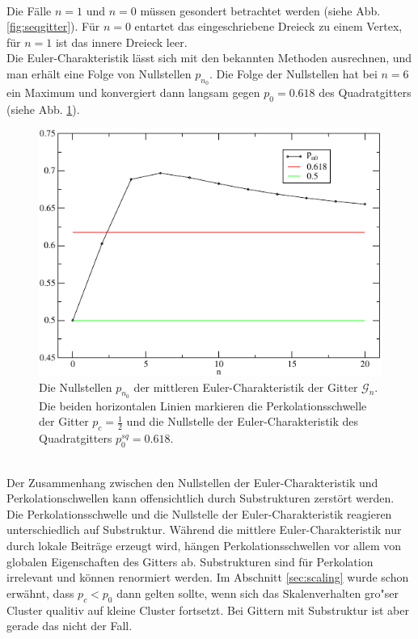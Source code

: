 \\Die F\"alle $n=1$ und $n=0$ m\"ussen gesondert betrachtet werden (siehe Abb. \ref{fig:seqgitter}). F\"ur $n=0$ entartet das eingeschriebene Dreieck zu einem Vertex, f\"ur $n=1$ ist das innere Dreieck leer.\\
Die Euler-Charakteristik l\"asst sich mit den bekannten Methoden ausrechnen, und man erh\"alt eine Folge von Nullstellen $p_{n_0}$. Die Folge der Nullstellen hat bei $n=6$ ein Maximum und konvergiert dann langsam gegen $p_0=0.618$ des Quadratgitters (siehe Abb. \ref{fig:sequenze}). 
\begin{figure}[tbp]
  \centering
  \includegraphics{./Grenzen-Figs/sequenze1}
  \caption{Die Nullstellen $p_{n_0}$ der mittleren Euler-Charakteristik der Gitter $\mathcal{G}_n$. Die beiden horizontalen Linien markieren die Perkolationsschwelle der Gitter $p_c=\frac{1}{2}$ und die Nullstelle der Euler-Charakteristik des Quadratgitters $p_0^{sq}=0.618$.}
  \label{fig:sequenze}
\end{figure}\\

Der Zusammenhang zwischen den Nullstellen der Euler-Charakteristik und Perkolationschwellen kann offensichtlich durch Substrukturen zerst\"ort werden. Die Perkolationsschwelle und die Nullstelle der Euler-Charakteristik reagieren unterschiedlich auf Substruktur. W\"ahrend die mittlere Euler-Charakteristik nur durch lokale Beitr\"age erzeugt wird, h\"angen Perkolationsschwellen vor allem von globalen Eigenschaften des Gitters ab. Substrukturen sind f\"ur Perkolation irrelevant und k\"onnen renormiert werden. Im Abschnitt \ref{sec:scaling} wurde schon erw\"ahnt, dass $p_c<p_0$ dann gelten sollte, wenn sich das Skalenverhalten gro"ser Cluster qualitiv auf kleine Cluster fortsetzt. Bei Gittern mit Substruktur ist aber gerade das nicht der Fall.


